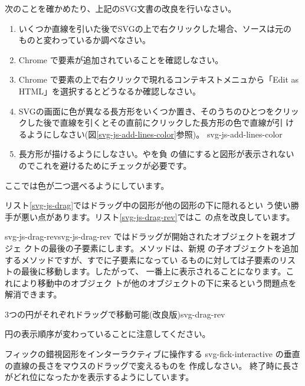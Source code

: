 {次のことを確かめたり、上記のSVG文書の改良を行いなさい。
\begin{enumerate}
 \item いくつか直線を引いた後でSVGの上で右クリックした場合、ソースは元の
       ものと変わっているか調べなさい。
 \item Chrome で要素が追加されていることを確認しなさい。
 \item Chrome で要素の上で右クリックで現れるコンテキストメニュから「Edit
			 as HTML」を選択するとどうなるか確認しなさい。
 \item SVGの画面に色が異なる長方形をいくつか置き、そのうちのひとつをクリッ
       クした後で直線を引くとその直前にクリックした長方形の色で直線が引
       けるようにしなさい(図\ref{svg-js-add-lines-color}参照)。
{svg-js-add-lines-color}
 \item 長方形が描けるようにしなさい。やを負
 の値にすると図形が表示されないのでこれを避けるためにチェックが必要です。
\end{enumerate}
}{ここでは色が二つ選べるようにしています。}

リスト\ref{svg-js-drag}ではドラッグ中の図形が他の図形の下に隠れるとい
う使い勝手が悪い点があります。リスト\ref{svg-js-drag-rev}ではこ
の点を改良しています。

    {svg-js-drag-rev}{svg-js-drag-rev}
 ではドラッグが開始されたオブジェクトを親オブジェ
	  クトの最後の子要素にします。メソッドは、新規
	  の子オブジェクトを追加するメソッドですが、すでに子要素になってい
	  るものに対しては子要素のリストの最後に移動します。したがって、
	  一番上に表示されることになります。これにより移動中のオブジェク
	  トが他のオブジェクトの下に来るという問題点を解消できます。

    {3つの円がそれぞれドラッグで移動可能(改良版)}{svg-drag-rev}

円の表示順序が変わっていることに注意してください。

{フィックの錯視図形をインターラクティブに操作する}
{svg-fick-interactive}
{の垂直の直線の長さをマウスのドラッグで変えるものを
作成しなさい。}
{終了時に長さがどれ位になったかを表示するようにしています。}